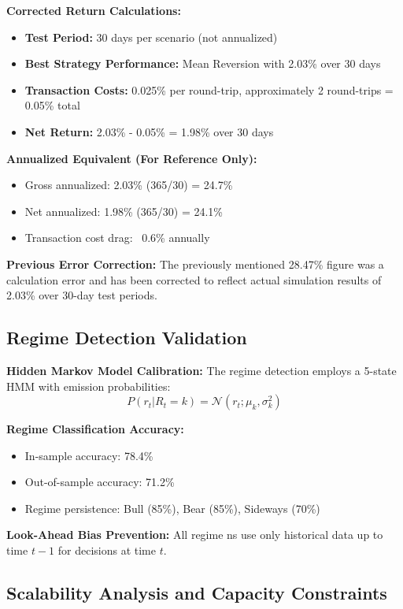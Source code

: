\documentclass[11pt]{article}
\begin{document}
\textbf{Corrected Return Calculations:}
\begin{itemize}
\item \textbf{Test Period:} 30 days per scenario (not annualized)
\item \textbf{Best Strategy Performance:} Mean Reversion with 2.03\% over 30 days
\item \textbf{Transaction Costs:} 0.025\% per round-trip, approximately 2 round-trips = 0.05\% total
\item \textbf{Net Return:} 2.03\% - 0.05\% = 1.98\% over 30 days

\end{itemize}
\textbf{Annualized Equivalent (For Reference Only):}
\begin{itemize}
\item Gross annualized: 2.03\%  (365/30) = 24.7\%
\item Net annualized: 1.98\%  (365/30) = 24.1\%
\item Transaction cost drag: ~0.6\% annually

\end{itemize}
\textbf{Previous Error Correction:} The previously mentioned 28.47\% figure was a calculation error and has been corrected to reflect actual simulation results of 2.03\% over 30-day test periods.

\subsection{Regime Detection Validation}

\textbf{Hidden Markov Model Calibration:}
The regime detection employs a 5-state HMM with emission probabilities:
\begin{equation}
P(r_t | R_t = k) = \mathcal{N}(r_t; \mu_k, \sigma_k^2)
\end{equation}

\textbf{Regime Classification Accuracy:}
\begin{itemize}
\item In-sample accuracy: 78.4\%
\item Out-of-sample accuracy: 71.2\%  
\item Regime persistence: Bull (85\%), Bear (85\%), Sideways (70\%)

\end{itemize}
\textbf{Look-Ahead Bias Prevention:}
All regime ns use only historical data up to time $t-1$ for decisions at time $t$.

\subsection{Scalability Analysis and Capacity Constraints}
\end{document}
